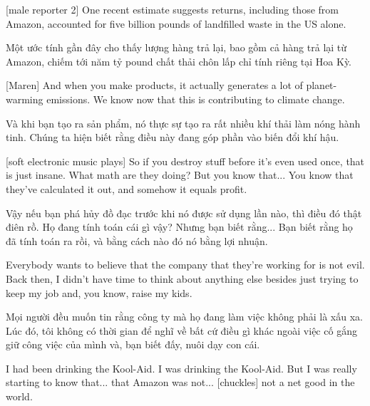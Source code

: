 \documentclass[a4paper]{article}
\begin{document}
	[male reporter 2] One recent estimate suggests returns, including those from Amazon, accounted for five billion pounds of landfilled waste in the US alone.
	
	\begin{vietnamese-v2}
		 Một ước tính gần đây cho thấy lượng hàng trả lại, bao gồm cả hàng trả lại từ Amazon, chiếm tới năm tỷ pound chất thải chôn lấp chỉ tính riêng tại Hoa Kỳ.
	\end{vietnamese-v2}
	
	[Maren] And when you make products, it actually generates a lot of planet-warming emissions. We know now that this is contributing to climate change.
	
	\begin{vietnamese-v2}
		[Maren] Và khi bạn tạo ra sản phẩm, nó thực sự tạo ra rất nhiều khí thải làm nóng hành tinh. Chúng ta hiện biết rằng điều này đang góp phần vào biến đổi khí hậu.
	\end{vietnamese-v2}
	
	[soft electronic music plays]
	So if you destroy stuff before it's even used once, that is just insane.
	What math are they doing?
	But you know that... You know that they've calculated it out, and somehow it equals profit.
	
	\begin{vietnamese-v2}
		Vậy nếu bạn phá hủy đồ đạc trước khi nó được sử dụng lần nào, thì điều đó thật điên rồ.
		Họ đang tính toán cái gì vậy?
		Nhưng bạn biết rằng... Bạn biết rằng họ đã tính toán ra rồi, và bằng cách nào đó nó bằng lợi nhuận.
	\end{vietnamese-v2}
	
	Everybody wants to believe that the company that they're working for is not evil.
	Back then, I didn't have time to think about anything else besides just trying to keep my job and, you know, raise my kids.
	
	\begin{vietnamese-v2}
		Mọi người đều muốn tin rằng công ty mà họ đang làm việc không phải là xấu xa.
		Lúc đó, tôi không có thời gian để nghĩ về bất cứ điều gì khác ngoài việc cố gắng giữ công việc của mình và, bạn biết đấy, nuôi dạy con cái.
	\end{vietnamese-v2}
	
	I had been drinking the Kool-Aid. I was drinking the Kool-Aid.
	But I was really starting to know that... that Amazon was not... [chuckles] not a net good in the world.
	
\end{document}
